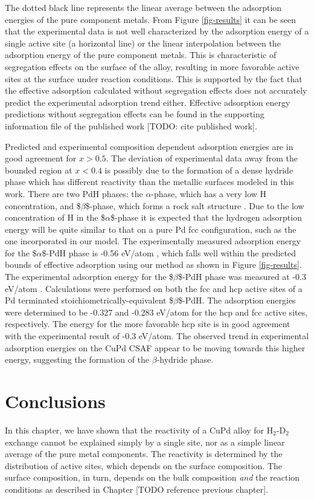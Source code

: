 \documentclass[12pt]{cmuthesis}
\begin{document}
The dotted black line represents the linear average between the adsorption energies of the pure component metals. From Figure \ref{fig-results} it can be seen that the experimental data is not well characterized by the adsorption energy of a single active site (a horizontal line) or the linear interpolation between the adsorption energy of the pure component metals. This is characteristic of segregation effects on the surface of the alloy, resulting in more favorable active sites at the surface under reaction conditions. This is supported by the fact that the effective adsorption calculated without segregation effects does not accurately predict the experimental adsorption trend either. Effective adsorption energy predictions without segregation effects can be found in the supporting information file of the published work [TODO: cite published work].

Predicted and experimental composition dependent adsorption energies are in good agreement for \(x > 0.5\). The deviation of experimental data away from the bounded region at \(x < 0.4\) is possibly due to the formation of a dense hydride phase which has different reactivity than the metallic surfaces modeled in this work. There are two PdH phases: the \(\alpha\)-phase, which has a very low H concentration, and \$\(\beta\)\$-phase, which forms a rock salt structure \cite{manchester-1994-h-pd}. Due to the low concentration of H in the \$\(\alpha\)\$-phase it is expected that the hydrogen adsorption energy will be quite similar to that on a pure Pd fcc configuration, such as the one incorporated in our model. The experimentally measured adsorption energy for the \$\(\alpha\)\$-PdH phase is -0.56 eV/atom \cite{obrien-2011-kinet-h}, which falls well within the predicted bounds of effective adsorption using our method as shown in Figure \ref{fig-results}. The experimental adsorption energy for the \$\(\beta\)\$-PdH phase was measured at -0.3 eV/atom \cite{obrien-2011-kinet-h}. Calculations were performed on both the fcc and hcp active sites of a Pd terminated stoichiometrically-equivalent \$\(\beta\)\$-PdH. The adsorption energies were determined to be -0.327 and -0.283 eV/atom for the hcp and fcc active sites, respectively. The energy for the more favorable hcp site is in good agreement with the experimental result of -0.3 eV/atom. The observed trend in experimental adsorption energies on the CuPd CSAF appear to be moving towards this higher energy, suggesting the formation of the \(\beta\)-hydride phase.

\section{Conclusions}
\label{sec:org9b3b300}
In this chapter, we have shown that the reactivity of a CuPd alloy for H\(_{\text{2}}\)-D\(_{\text{2}}\) exchange cannot be explained simply by a single site, nor as a simple linear average of the pure metal components. The reactivity is determined by the distribution of active sites, which depends on the surface composition. The surface composition, in turn, depends on the bulk composition \emph{and} the reaction conditions as described in Chapter [TODO reference previous chapter].
\end{document}
